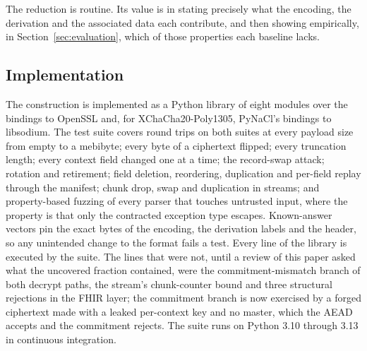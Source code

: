 The reduction is routine. Its value is in stating precisely what the encoding, the derivation and the associated data each contribute, and then showing empirically, in Section~\ref{sec:evaluation}, which of those properties each baseline lacks.

\subsection{Implementation}
\label{sec:impl}

The construction is implemented as a Python library of eight modules over the  bindings to OpenSSL and, for XChaCha20-Poly1305, PyNaCl's bindings to libsodium. The test suite covers round trips on both suites at every payload size from empty to a mebibyte; every byte of a ciphertext flipped; every truncation length; every context field changed one at a time; the record-swap attack; rotation and retirement; field deletion, reordering, duplication and per-field replay through the manifest; chunk drop, swap and duplication in streams; and property-based fuzzing of every parser that touches untrusted input, where the property is that only the contracted exception type escapes. Known-answer vectors pin the exact bytes of the encoding, the derivation labels and the header, so any unintended change to the format fails a test. Every line of the library is executed by the suite. The lines that were not, until a review of this paper asked what the uncovered fraction contained, were the commitment-mismatch branch of both decrypt paths, the stream's chunk-counter bound and three structural rejections in the FHIR layer; the commitment branch is now exercised by a forged ciphertext made with a leaked per-context key and no master, which the AEAD accepts and the commitment rejects. The suite runs on Python 3.10 through 3.13 in continuous integration.
